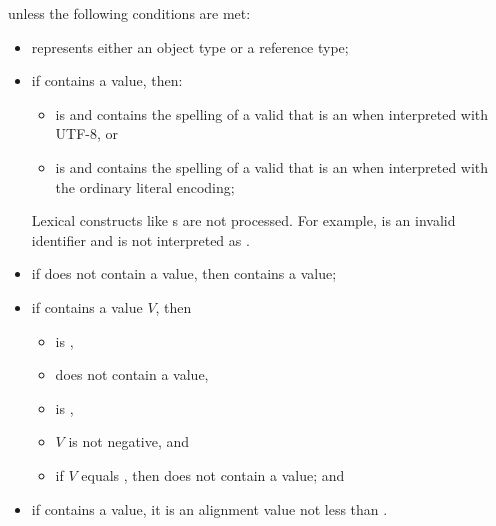 \begin{itemdescr}
\pnum
\throws
{} unless the following conditions are met:
\begin{itemize}
\item
   represents either an object type or a reference type;
\item
  if  contains a value, then:
  \begin{itemize}
  \item
     is 
    and 
    contains the spelling of a valid 
    that is an 
    when interpreted with UTF-8, or
  \item
     is 
    and 
    contains the spelling of a valid 
    that is an 
    when interpreted with the ordinary literal encoding;
  \end{itemize}
  \begin{note}
  Lexical constructs like
  s are not processed.
  For example,  is an invalid identifier
  and is not interpreted as .
  \end{note}
\item
  if  does not contain a value,
  then  contains a value;
\item
  if  contains a value $V$, then
  \begin{itemize}
  \item
     is ,
  \item
     does not contain a value,
  \item
     is ,
  \item
    $V$ is not negative, and
  \item
    if $V$ equals ,
    then  does not contain a value; and
  \end{itemize}
  \item
    if  contains a value,
    it is an alignment value
    not less than .
\end{itemize}
\end{itemdescr}

